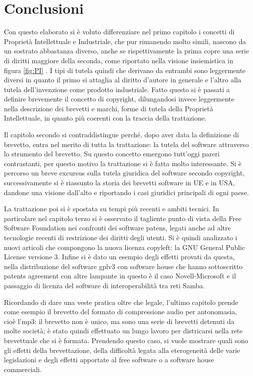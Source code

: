  \chapter{Conclusioni}

Con questo elaborato si è voluto differenziare nel primo capitolo i concetti di Proprietà Intellettuale e Industriale, che pur rimanendo molto simili, nascono da un sostrato abbastanza diverso, anche se rispettivamente la prima copre una serie di diritti maggiore della seconda, come riportato nella visione insiemistica in figura \ref{fig:PI} . I tipi di tutela quindi che derivano da entrambi sono leggermente diversi in quanto il primo si attaglia al diritto d'autore in generale e l'altro alla tutela dell'invenzione come prodotto industriale. Fatto questo si è passati a definire brevemente il concetto di copyright, dilungandosi invece leggermente nella descrizione dei brevetti e marchi, forme di tutela della Proprietà Intellettuale, in quanto più coerenti con la traccia della trattazione.

Il capitolo secondo si contraddistingue perché, dopo aver data la definizione di brevetto, entra nel merito di tutta la trattazione: la tutela del software attraverso lo strumento del brevetto. Su questo concetto emergono tutt'oggi pareri contrastanti, per questo motivo la trattazione si è fatta molto interessante. Si è percorso un breve excursus sulla tutela giuridica del software secondo copyright, successivamente si è riassunto la storia dei brevetti software in UE e in USA, dandone una visione dall'alto e riportando i casi giuridici principali di ogni paese.

La trattazione poi si è spostata su tempi più recenti e ambiti tecnici. In particolare nel capitolo terzo si è osservato il tagliente punto di vista della Free Software Foundation nei confronti dei software patens, legati anche ad altre tecnologie recenti di restrizione dei diritti degli utenti. Si è quindi analizzato i nuovi articoli che compongono la nuova licenza copyleft: la GNU General Public License versione 3.
Infine si è dato un esempio degli effetti provati da questa, nella distribuzione del software gplv3 con software house che hanno sottoscritto patents agreement con altre lampante in questo è il caso Novell-Microsoft e il passaggio di licenza del software di interoperabilità tra reti Samba.

Ricordando di dare una veste pratica oltre che legale, l'ultimo capitolo prende come esempio il brevetto del formato di compressione audio per antonomasia, cioè l'mp3: il brevetto non è unico, ma sono una serie di brevetti detenuti da molte società; è stato quindi effettuato un lungo lavoro per districarsi nella rete brevettuale che si è formata. Prendendo questo caso, si vuole mostrare quali sono gli effetti della brevettazione, della difficoltà legata alla eterogeneità delle varie legislazioni e degli effetti apportate al free software o a software house commerciali.

